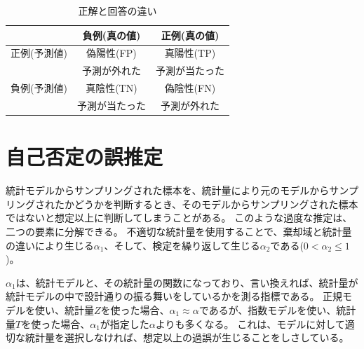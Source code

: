     
    \begin{table}[hbtp]
    \caption{正解と回答の違い}
    \label{table:Yes_no_answer}
    \centering
    \begin{tabular}{ccc}
          &  負例(真の値) & 正例(真の値)  \\
        \hline \hline
        正例(予測値) &  偽陽性(FP)  & 真陽性(TP)\\
        &予測が外れた & 予測が当たった\\
        負例(予測値) & 真陰性(TN) & 偽陰性(FN)\\
        & 予測が当たった & 予測が外れた\\
        \hline
    \end{tabular}
    \end{table}

    


\section{自己否定の誤推定}
統計モデルからサンプリングされた標本を、統計量により元のモデルからサンプリングされたかどうかを判断するとき、そのモデルからサンプリングされた標本ではないと想定以上に判断してしまうことがある。
このような過度な推定は、二つの要素に分解できる。
不適切な統計量を使用することで、棄却域と統計量の違いにより生じる$\alpha_1$、そして、検定を繰り返して生じる$\alpha_2$である($0<\alpha_2 \leq 1$)。

$\alpha_1$は、統計モデルと、その統計量の関数になっており、言い換えれば、統計量が統計モデルの中で設計通りの振る舞いをしているかを測る指標である。
正規モデルを使い、統計量$Z$を使った場合、$\alpha_1 \approx	 \alpha $であるが、指数モデルを使い、統計量$T$を使った場合、$\alpha_1$が指定した$\alpha$よりも多くなる。
これは、モデルに対して適切な統計量を選択しなければ、想定以上の過誤が生じることをしさしている。







